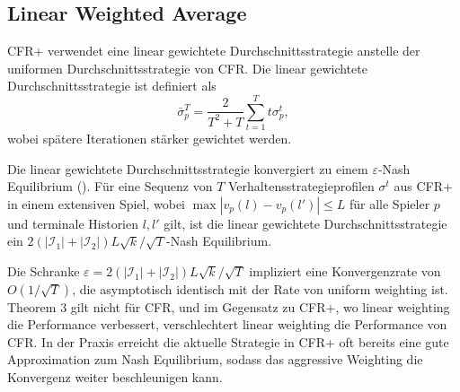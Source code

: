 \subsection{Linear Weighted Average}

CFR+ verwendet eine linear gewichtete Durchschnittsstrategie anstelle der uniformen Durchschnittsstrategie von CFR.
Die linear gewichtete Durchschnittsstrategie ist definiert als
\begin{equation}
\bar{\sigma}_p^T = \frac{2}{T^2 + T} \sum_{t=1}^T t\sigma_p^t,
\end{equation}
wobei spätere Iterationen stärker gewichtet werden.

Die linear gewichtete Durchschnittsstrategie konvergiert zu einem $\varepsilon$-Nash Equilibrium (\cite[Thm.~3]{tammelin2015solving}).
Für eine Sequenz von $T$ Verhaltensstrategieprofilen $\sigma^t$ aus CFR+ in einem extensiven Spiel, wobei $\max |v_p(l) - v_p(l')| \le L$ für alle Spieler $p$ und terminale Historien $l, l'$ gilt, ist die linear gewichtete Durchschnittsstrategie ein $2(|\mathcal{I}_1| + |\mathcal{I}_2|)L\sqrt{k}/\sqrt{T}$-Nash Equilibrium.

Die Schranke $\varepsilon = 2(|\mathcal{I}_1| + |\mathcal{I}_2|)L\sqrt{k}/\sqrt{T}$ impliziert eine Konvergenzrate von $O(1/\sqrt{T})$, die asymptotisch identisch mit der Rate von uniform weighting ist.
Theorem 3 gilt nicht für CFR, und im Gegensatz zu CFR+, wo linear weighting die Performance verbessert, verschlechtert linear weighting die Performance von CFR.
In der Praxis erreicht die aktuelle Strategie in CFR+ oft bereits eine gute Approximation zum Nash Equilibrium, sodass das aggressive Weighting die Konvergenz weiter beschleunigen kann.

